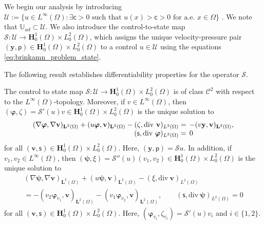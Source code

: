 \documentclass[final]{siamart0216}
\begin{document}
We begin our analysis by introducing $\mathcal{U}:=\{u\in L^\infty(\Omega):\exists \mathsf{c}>0\text{ such that }u(x)>\mathsf{c}>0\text{ for a.e. } x\in\Omega\}$ \cite[page 783]{MR2536007}. We note that $\mathbb{U}_{ad}\subset\mathcal{U}$. We also introduce the control-to-state map $\mathcal{S}:\mathcal{U}\to \mathbf{H}_0^1(\Omega)\times L_0^2(\Omega)$, which assigns the unique velocity-pressure pair $(\mathbf{y},\mathsf{p}) \in \mathbf{H}_0^1(\Omega) \times L_0^2(\Omega)$ to a control $u \in \mathcal{U}$ using the equations \eqref{eq:brinkamn_problem_state}.

The following result establishes differentiability properties for the operator $\mathcal{S}$.

\begin{theorem}\label{diff_S}
The control to state map $\mathcal{S}:\mathcal{U}\to \mathbf{H}_0^1(\Omega)\times L_0^2(\Omega)$ is of class $\mathcal{C}^2$ with respect to the $L^{\infty}(\Omega)$-topology. Moreover, if $v\in L^{\infty}(\Omega)$, then $(\boldsymbol{\varphi},\zeta)=\mathcal{S}'(u)v\in \mathbf{H}_0^1(\Omega)\times L_0^2(\Omega)$ is the unique solution to
\begin{equation}\label{eq:problem_S_first}
\begin{array}{rl}
(\nabla \boldsymbol{\varphi},\nabla \mathbf{v})_{\mathbf{L}^2(\Omega)}+( u\boldsymbol{\varphi}, \mathbf{v})_{\mathbf{L}^2(\Omega)}-(\zeta,\mathrm{div~} \mathbf{v})_{L^2(\Omega)}
=
&
\hspace{-2mm}
-(v\mathbf{y},\mathbf{v})_{\mathbf{L}^2(\Omega)},
\\
(\mathsf{s},\mathrm{div~} \boldsymbol{\varphi})_{L^2(\Omega)}
=
&
\hspace{-2mm}
0
\end{array}
\end{equation}
for all $(\mathbf{v},\mathsf{s}) \in \mathbf{H}_0^1(\Omega) \times L_0^2(\Omega)$. Here, $(\mathbf{y},\mathsf{p})=\mathcal{S}u$. In addition, if $v_1,v_2 \in L^{\infty}(\Omega)$, then $(\boldsymbol{\psi},\xi)=\mathcal{S}''(u)(v_1,v_2)\in \mathbf{H}_0^1(\Omega)\times L_0^2(\Omega)$ is the unique solution to
\begin{multline}\label{eq:problem_S_second}
(\nabla \boldsymbol{\psi},\nabla \mathbf{v})_{\mathbf{L}^2(\Omega)}+( u\boldsymbol{\psi},\mathbf{v})_{\mathbf{L}^2(\Omega)}-(\xi,\mathrm{div~} \mathbf{v})_{L^2(\Omega)}
\\
=
-(v_2\boldsymbol{\varphi}_{v_1},\mathbf{v})_{\mathbf{L}^2(\Omega)}-(v_1\boldsymbol{\varphi}_{v_2},\mathbf{v})_{\mathbf{L}^2(\Omega)},
\qquad
(\mathsf{s},\mathrm{div~} \boldsymbol{\psi})_{L^2(\Omega)}  = 0
\end{multline}
for all $(\mathbf{v},\mathsf{s}) \in \mathbf{H}_0^1(\Omega) \times L_0^2(\Omega)$. Here, $(\boldsymbol{\varphi}_{v_i},\zeta_{v_i})=\mathcal{S}'(u)v_i$ and $i\in\{1,2\}$.
\end{theorem}
\end{document}
